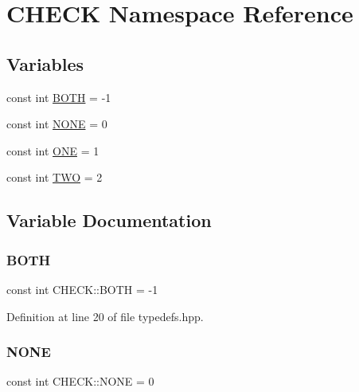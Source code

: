 \hypertarget{namespace_c_h_e_c_k}{}\section{C\+H\+E\+CK Namespace Reference}
\label{namespace_c_h_e_c_k}
\subsection*{Variables}
\begin{DoxyCompactItemize}
\item 
const int \hyperlink{namespace_c_h_e_c_k_a3acda1c74bfabb5b6b67e19d0ad2d52a}{B\+O\+TH} = -\/1
\item 
const int \hyperlink{namespace_c_h_e_c_k_a35fad085a9d64167bd4550445c4dc9e1}{N\+O\+NE} = 0
\item 
const int \hyperlink{namespace_c_h_e_c_k_acf8ecf93ddfb75456112712630f8f722}{O\+NE} = 1
\item 
const int \hyperlink{namespace_c_h_e_c_k_a2b112aaec4c59311376a5a60f291aa48}{T\+WO} = 2
\end{DoxyCompactItemize}


\subsection{Variable Documentation}
\mbox{\label{namespace_c_h_e_c_k_a3acda1c74bfabb5b6b67e19d0ad2d52a}} 
\subsubsection{\texorpdfstring{B\+O\+TH}{BOTH}}
{\footnotesize\ttfamily const int C\+H\+E\+C\+K\+::\+B\+O\+TH = -\/1}



Definition at line 20 of file typedefs.\+hpp.

\mbox{\label{namespace_c_h_e_c_k_a35fad085a9d64167bd4550445c4dc9e1}} 
\subsubsection{\texorpdfstring{N\+O\+NE}{NONE}}
{\footnotesize\ttfamily const int C\+H\+E\+C\+K\+::\+N\+O\+NE = 0}



